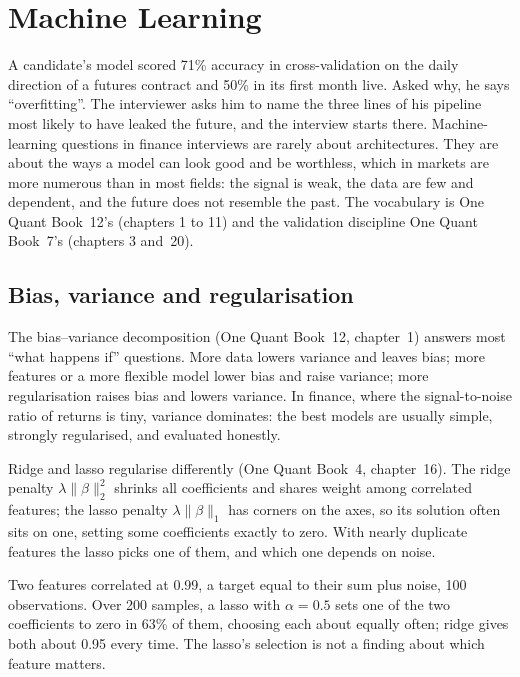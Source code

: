 \chapter{Machine Learning}\label{ch:iv:machine-learning}

A candidate's model scored 71\% accuracy in cross-validation on the daily direction of a futures contract and 50\% in its
first month live. Asked why, he says ``overfitting''. The interviewer asks him to name the three lines of his pipeline most
likely to have leaked the future, and the interview starts there. Machine-learning questions in finance interviews are
rarely about architectures. They are about the ways a model can look good and be worthless, which in markets are more
numerous than in most fields: the signal is weak, the data are few and dependent, and the future does not resemble the
past. The vocabulary is One Quant Book~12's (chapters 1 to 11) and the validation discipline One Quant Book~7's
(chapters 3 and~20).

\section{Bias, variance and regularisation}

The bias--variance decomposition (One Quant Book~12, chapter~1) answers most ``what happens if'' questions. More data lowers
variance and leaves bias; more features or a more flexible model lower bias and raise variance; more regularisation raises
bias and lowers variance. In finance, where the signal-to-noise ratio of returns is tiny, variance dominates: the best
models are usually simple, strongly regularised, and evaluated honestly.

Ridge and lasso regularise differently (One Quant Book~4, chapter~16). The ridge penalty $\lambda\|\beta\|_2^2$ shrinks all
coefficients and shares weight among correlated features; the lasso penalty $\lambda\|\beta\|_1$ has corners on the axes, so
its solution often sits on one, setting some coefficients exactly to zero. With nearly duplicate features the lasso picks
one of them, and which one depends on noise.

\begin{example}\label{ex:iv:machine-learning:lasso}
Two features correlated at 0.99, a target equal to their sum plus noise, 100 observations. Over 200 samples, a lasso with
$\alpha = 0.5$ sets one of the two coefficients to zero in 63\% of them, choosing each about equally often; ridge gives both
about 0.95 every time. The lasso's selection is not a finding about which feature matters.
\end{example}

